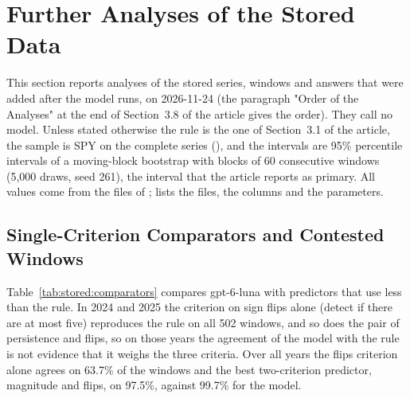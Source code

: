 \section{Further Analyses of the Stored Data}
\label{sup:stored}

This section reports analyses of the stored series, windows and answers that were added after the model runs, on 2026-11-24 (the paragraph "Order of the Analyses" at the end of Section~3.8 of the article gives the order). They call no model. Unless stated otherwise the rule is the one of Section~3.1 of the article, the sample is SPY on the complete series (), and the intervals are 95\% percentile intervals of a moving-block bootstrap with blocks of 60 consecutive windows (5{,}000 draws, seed 261), the interval that the article reports as primary. All values come from the files  of ;  lists the files, the columns and the parameters.

\subsection{Single-Criterion Comparators and Contested Windows}
\label{sup:stored:e1}

Table~\ref{tab:stored:comparators} compares gpt-6-luna with predictors that use less than the rule. In 2024 and 2025 the criterion on sign flips alone (detect if there are at most five) reproduces the rule on all 502 windows, and so does the pair of persistence and flips, so on those years the agreement of the model with the rule is not evidence that it weighs the three criteria. Over all years the flips criterion alone agrees on 63.7\% of the windows and the best two-criterion predictor, magnitude and flips, on 97.5\%, against 99.7\% for the model.

